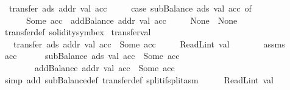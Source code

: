 \begin{isabellebody}
\isanewline
\ \ {\isachardoublequoteopen}transfer\ ads\ addr\ val\ acc\ {\isacharequal}{\kern0pt}\isanewline
\ \ \ \ {\isacharparenleft}{\kern0pt}case\ subBalance\ ads\ val\ acc\ of\isanewline
\ \ \ \ \ \ Some\ acc{\isacharprime}{\kern0pt}\ {\isasymRightarrow}\ addBalance\ addr\ val\ acc{\isacharprime}{\kern0pt}\isanewline
\ \ \ \ {\isacharbar}{\kern0pt}\ None\ {\isasymRightarrow}\ None{\isacharparenright}{\kern0pt}{\isachardoublequoteclose}\isanewline
\isanewline
{}\isamarkupfalse%
\ transfer{\isacharunderscore}{\kern0pt}def\ {\isacharbrackleft}{\kern0pt}solidity{\isacharunderscore}{\kern0pt}symbex{\isacharbrackright}{\kern0pt}\isanewline
\isanewline
{}\isamarkupfalse%
\ transfer{\isacharunderscore}{\kern0pt}val{}{\isacharcolon}{\kern0pt}\isanewline
\ \ \ {\isachardoublequoteopen}transfer\ ads\ addr\ val\ acc\ {\isacharequal}{\kern0pt}\ Some\ acc{\isacharprime}{\kern0pt}{\isachardoublequoteclose}\isanewline
\ \ \ \ \ {\isachardoublequoteopen}ReadL\isactrlsub i\isactrlsub n\isactrlsub t\ val\ {\isasymge}\ {}{\isachardoublequoteclose}\isanewline
%
\isadelimproof
%
\endisadelimproof
%
\isatagproof
{}\isamarkupfalse%
\ {\isacharminus}{\kern0pt}\isanewline
\ \ \isamarkupfalse%
\ assms{\isacharparenleft}{\kern0pt}{}{\isacharparenright}{\kern0pt}\ \isamarkupfalse%
\ acc{\isacharprime}{\kern0pt}{\isacharprime}{\kern0pt}\isanewline
\ \ \ \ \ {\isacharasterisk}{\kern0pt}{\isacharcolon}{\kern0pt}\ {\isachardoublequoteopen}subBalance\ ads\ val\ acc\ {\isacharequal}{\kern0pt}\ Some\ acc{\isacharprime}{\kern0pt}{\isacharprime}{\kern0pt}{\isachardoublequoteclose}\isanewline
\ \ \ \ \ \ \ {\isacharasterisk}{\kern0pt}{\isacharasterisk}{\kern0pt}{\isacharcolon}{\kern0pt}\ {\isachardoublequoteopen}addBalance\ addr\ val\ acc{\isacharprime}{\kern0pt}{\isacharprime}{\kern0pt}\ {\isacharequal}{\kern0pt}\ Some\ acc{\isacharprime}{\kern0pt}{\isachardoublequoteclose}\ \isamarkupfalse%
\ {\isacharparenleft}{\kern0pt}simp\ add{\isacharcolon}{\kern0pt}\ subBalance{\isacharunderscore}{\kern0pt}def\ transfer{\isacharunderscore}{\kern0pt}def\ split{\isacharcolon}{\kern0pt}if{\isacharunderscore}{\kern0pt}split{\isacharunderscore}{\kern0pt}asm{\isacharparenright}{\kern0pt}\isanewline
\ \ \isamarkupfalse%
\ \isamarkupfalse%
\ {\isachardoublequoteopen}ReadL\isactrlsub i\isactrlsub n\isactrlsub t\ val\ {\isasymge}\ {}{\isachardoublequoteclose}\ \isamarkupfalse%

\end{isabellebody}
